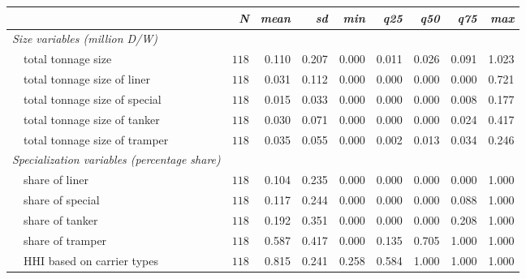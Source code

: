 \begin{tabular}{lrrrrrrrr}
\toprule
\multicolumn{1}{l}{\itshape }&\multicolumn{1}{r}{\itshape N}&\multicolumn{1}{r}{\itshape mean}&\multicolumn{1}{r}{\itshape sd}&\multicolumn{1}{r}{\itshape min}&\multicolumn{1}{r}{\itshape q25}&\multicolumn{1}{r}{\itshape q50}&\multicolumn{1}{r}{\itshape q75}&\multicolumn{1}{r}{\itshape max}\tabularnewline
\midrule
{\itshape Size variables (million D/W)}&&&&&&&&\tabularnewline
~~total tonnage size&$118$&0.110&0.207&0.000&0.011&0.026&0.091&1.023\tabularnewline
~~total tonnage size of liner&$118$&0.031&0.112&0.000&0.000&0.000&0.000&0.721\tabularnewline
~~total tonnage size of special&$118$&0.015&0.033&0.000&0.000&0.000&0.008&0.177\tabularnewline
~~total tonnage size of tanker&$118$&0.030&0.071&0.000&0.000&0.000&0.024&0.417\tabularnewline
~~total tonnage size of tramper&$118$&0.035&0.055&0.000&0.002&0.013&0.034&0.246\tabularnewline
\midrule
{\itshape Specialization variables (percentage share)}&&&&&&&&\tabularnewline
~~share of liner&$118$&0.104&0.235&0.000&0.000&0.000&0.000&1.000\tabularnewline
~~share of special&$118$&0.117&0.244&0.000&0.000&0.000&0.088&1.000\tabularnewline
~~share of tanker&$118$&0.192&0.351&0.000&0.000&0.000&0.208&1.000\tabularnewline
~~share of tramper&$118$&0.587&0.417&0.000&0.135&0.705&1.000&1.000\tabularnewline
~~HHI based on carrier types&$118$&0.815&0.241&0.258&0.584&1.000&1.000&1.000\tabularnewline
\bottomrule
\end{tabular}
